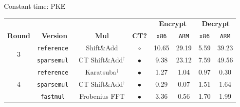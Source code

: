 \begin{frame}{Constant-time: PKE}
    \begin{block}{}
        \begin{table}[H]\footnotesize
            \centering
            \begin{tabular}{c | c c c | c c | c c}
                \toprule
                & & & &  \multicolumn{2}{c|}{\textbf{Encrypt}} & \multicolumn{2}{c}{\textbf{Decrypt}}\\
                \textbf{Round} & \textbf{Version} & \textbf{Mul} & \textbf{CT?} & \texttt{x86} & \texttt{ARM} & \texttt{x86} & \texttt{ARM} \\
                \midrule
                \multirow{2}{*}{3}
                & \tt{reference} & Shift\&Add & $\circ$ & 10.65 & 29.19 & 5.59 & 39.23 \\
                & \tt{sparsemul} & CT Shift\&Add$^\dagger$ & $\bullet$ & 9.38 & 23.12 & 7.59 & 49.56 \\
                \midrule
                \multirow{3}{*}{4}
                & \tt{reference} & Karatsuba$^\dagger$ & $\bullet$ & 1.27 & 1.04 & 0.97 & 0.30 \\
                & \tt{sparsemul} & CT Shift\&Add$^\dagger$ & $\bullet$ & 0.29 & 0.07 & 1.51 & 1.64 \\
                & \tt{fastmul} & Frobenius FFT & $\bullet$ & 3.36 & 0.56 & 1.70 & 1.99 \\
                \bottomrule
            \end{tabular}
        \end{table}
    \end{block}
\end{frame}

